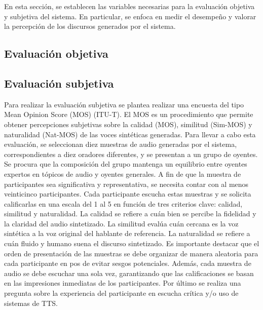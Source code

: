 En esta sección, se establecen las variables necesarias para la evaluación objetiva y subjetiva del sistema. En particular, se enfoca en medir el desempeño y valorar la percepción de los discursos generados por el sistema.

\subsection{Evaluación objetiva}



\subsection{Evaluación subjetiva}

Para realizar la evaluación subjetiva se plantea realizar una encuesta del tipo Mean Opinion Score (MOS) (ITU-T). El MOS es un procedimiento que permite obtener percepciones subjetivas sobre la calidad (MOS), similitud (Sim-MOS) y naturalidad (Nat-MOS) de las voces sintéticas generadas. Para llevar a cabo esta evaluación, se seleccionan diez muestras de audio generadas por el sistema, correspondientes a diez oradores diferentes, y se presentan a un grupo de oyentes. Se procura que la composición del grupo mantenga un equilibrio entre oyentes expertos en tópicos de audio y oyentes generales. A fin de que la muestra de participantes sea significativa y representativa, se necesita contar con al menos veinticinco participantes. Cada participante escucha estas muestras y se solicita calificarlas en una escala del 1 al 5 en función de tres criterios clave: calidad, similitud y naturalidad. La calidad se refiere a cuán bien se percibe la fidelidad y la claridad del audio sintetizado. La similitud evalúa cuán cercana es la voz sintética a la voz original del hablante de referencia. La naturalidad se refiere a cuán fluido y humano suena el discurso sintetizado. Es importante destacar que el orden de presentación de las muestras se debe organizar de manera aleatoria para cada participante en pos de evitar sesgos potenciales. Además, cada muestra de audio se debe escuchar una sola vez, garantizando que las calificaciones se basan en las impresiones inmediatas de los participantes. Por último se realiza una pregunta sobre la experiencia del participante en escucha crítica y/o uso de sistemas de TTS.
